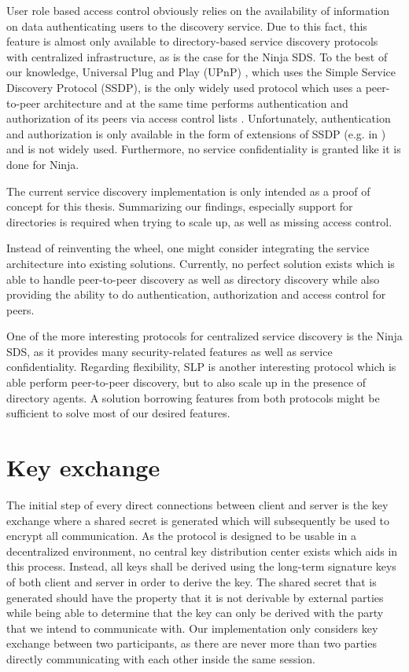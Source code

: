User role based access control obviously relies on the availability of information on data authenticating users to the discovery service.
Due to this fact, this feature is almost only available to directory-based service discovery protocols with centralized infrastructure, as is the case for the Ninja SDS.
To the best of our knowledge, Universal Plug and Play (UPnP) \cite{miller2001home}, which uses the Simple Service Discovery Protocol (SSDP), is the only widely used protocol which uses a peer-to-peer architecture and at the same time performs authentication and authorization of its peers via access control lists \cite{zhu2005service,edwards2006discovery}.
Unfortunately, authentication and authorization is only available in the form of extensions of SSDP (e.g.  in \cite{ellison2003device}) and is not widely used.
Furthermore, no service confidentiality is granted like it is done for Ninja.

\bigskip

The current service discovery implementation is only intended as a proof of concept for this thesis.
Summarizing our findings, especially support for directories is required when trying to scale up, as well as missing access control.

Instead of reinventing the wheel, one might consider integrating the service architecture into existing solutions.
Currently, no perfect solution exists which is able to handle peer-to-peer discovery as well as directory discovery while also providing the ability to do authentication, authorization and access control for peers.

One of the more interesting protocols for centralized service discovery is the Ninja SDS, as it provides many security-related features as well as service confidentiality.
Regarding flexibility, SLP is another interesting protocol which is able perform peer-to-peer discovery, but to also scale up in the presence of directory agents.
A solution borrowing features from both protocols might be sufficient to solve most of our desired features.

\section{Key exchange}
\label{sec:key-exchange}

The initial step of every direct connections between client and server is the key exchange where a shared secret is generated which will subsequently be used to encrypt all communication.
As the protocol is designed to be usable in a decentralized environment, no central key distribution center exists which aids in this process.
Instead, all keys shall be derived using the long-term signature keys of both client and server in order to derive the key.
The shared secret that is generated should have the property that it is not derivable by external parties while being able to determine that the key can only be derived with the party that we intend to communicate with.
Our implementation only considers key exchange between two participants, as there are never more than two parties directly communicating with each other inside the same session.

